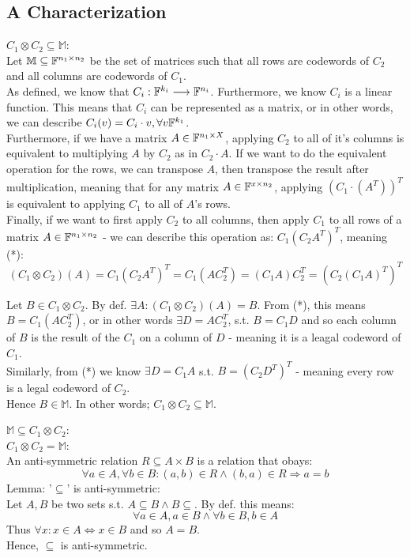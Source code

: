 \subsection{A Characterization}
\underline{$C_1\otimes C_2\subseteq\mathbb{M}$}:\\
Let $\mathbb{M}\subseteq\mathbb{F}^{n_1\times n_2}$ be the set of matrices 
such that all rows are codewords of $C_2$ and all columns are codewords of $C_1$.\\

As defined, we know that $C_i:\mathbb{F}^{k_i}\longrightarrow\mathbb{F}^{n_i}$. Furthermore,
we know $C_i$ is a linear function. This means that $C_i$ can be represented as a
matrix, or in other words, we can describe $C_i(v)=C_i\cdot v, \forall v\mathbb{F}^{k_1}$.\\
Furthermore, if we have a matrix $A\in\mathbb{F}^{n_1\times X}$,
applying $C_2$ to all of it's columns is equivalent to multiplying $A$ by $C_2$ as in $C_2\cdot A$.
If we want to do the equivalent operation for the rows, we can transpose $A$, then transpose the result
after multiplication, meaning that for any matrix $A\in\mathbb{F}^{x\times n_2}$,
applying $(C_1\cdot(A^T))^T$ is equivalent to applying $C_1$ to all of $A$'s rows.\\

Finally, if we want to first apply $C_2$ to all columns, then apply $C_1$ to all rows of
a matrix $A\in\mathbb{F}^{n_1\times n_2}$ - we can describe this operation as: $C_1(C_2A^T)^T$, meaning (*):
\[
    (C_1\otimes C_2)(A)=C_1(C_2A^T)^T=C_1(AC_2^T)=(C_1A)C_2^T=(C_2(C_1A)^T)^T
\]

Let $B\in C_1\otimes C_2$. By def. $\exists A: (C_1\otimes C_2)(A)=B$.
From (*), this means $B=C_1(AC_2^T)$, or in other words $\exists D=AC_2^T$,
s.t. $B = C_1D$ and so each column of $B$ is the result of the
$C_1$ on a column of $D$ - meaning it is a leagal codeword of $C_1$.\\
Similarly, from (*) we know $\exists D=C_1A$ s.t. $B=(C_2D^T)^T$ - meaning
every row is a legal codeword of $C_2$.\\
Hence $B\in\mathbb{M}$.
In other words; $C_1\otimes C_2\subseteq\mathbb{M}$.

\underline{$\mathbb{M}\subseteq C_1\otimes C_2$}:\\

\underline{$C_1\otimes C_2=\mathbb{M}$}:\\
An anti-symmetric relation $R\subseteq A\times B$ is
a relation that obays:
\[
    \forall a\in A, \forall b\in B: (a,b)\in R \wedge (b,a)\in R \Rightarrow a=b
\]
Lemma: '$\subseteq$' is anti-symmetric:\\
Let $A,B$ be two sets s.t. $A\subseteq B\wedge B\subseteq$.
By def. this means:
\[\forall a\in A, a\in B\wedge \forall b\in B, b\in A\]
Thus $\forall x: x\in A\iff x\in B$ and so $A=B$.\\
Hence, $\subseteq$ is anti-symmetric.\\

